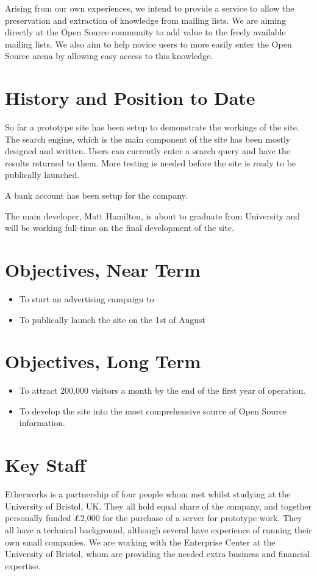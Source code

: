 Arising from our own experiences, we intend to provide a service to allow the preservation and extraction of knowledge from mailing lists. We are aiming directly at the Open Source community to add value to the freely available mailing lists.  We also aim to help novice users to more easily enter the Open Source arena by allowing easy access to this knowledge.


\section{History and Position to Date}
So far a prototype site has been setup to demonstrate the workings of the
site.  The search engine, which is the main component of the site has been
mostly designed and written.  Users can currently enter a search query and
have the results returned to them.  More testing is needed before the site
is ready to be publically launched.

A bank account has been setup for the company.

The main developer, Matt Hamilton, is about to graduate from University
and will be working full-time on the final development of the site.

\section{Objectives, Near Term}
\begin{itemize}
\item To start an advertising campaign to 
\item To publically launch the site on the 1st of August
\end{itemize}

\section{Objectives, Long Term}
\begin{itemize}
\item To attract 200,000 visitors a month by the end of the first year of operation.
\item To develop the site into the most comprehensive source of Open Source information.
\end{itemize}

\section{Key Staff}
Etherworks is a partnership of four people whom met whilst studying at the University of Bristol, UK.  They all hold equal share of the company, and together personally funded \pounds2,000 for the purchase of a server for prototype work.  They all have a technical background, although several have experience of running their own small companies.  We are working with the Enterprise Center \cite{www:bec} at the University of Bristol, whom are providing the needed extra business and financial expertise.

